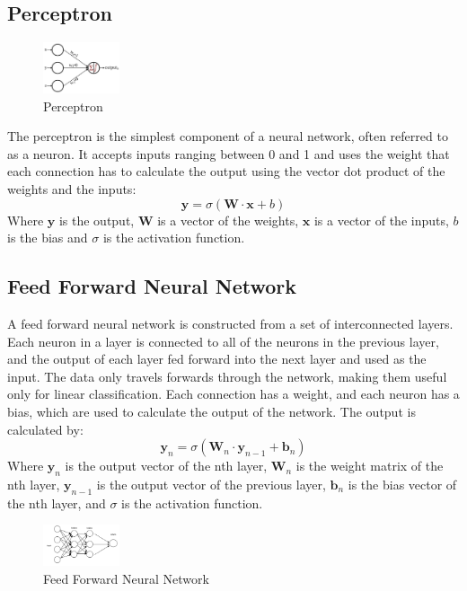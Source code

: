 \documentclass[a1,portrait]{a1poster}
\begin{document}
\begin{multicols}{2}
\subsection*{Perceptron}
\begin{figure}
    \centering
    \includegraphics[width=0.2\textwidth]{assets/perceptron.png}
    \caption{Perceptron}
    \label{fig:perceptron}
\end{figure}
The perceptron is the simplest component of a neural network, often referred to as a neuron. It accepts inputs ranging between 0 and 1 and uses the weight that each connection has to calculate the output using the vector dot product of the weights and the inputs:
\begin{equation}
    \textbf{y} = \sigma(\textbf{W}\cdot\textbf{x} + b)
    \label{eq:perceptron}
\end{equation}
Where $\textbf{y}$ is the output, $\textbf{W}$ is a vector of the weights, $\textbf{x}$ is a vector of the inputs, $b$ is the bias and $\sigma$ is the activation function.

\subsection*{Feed Forward Neural Network}
A feed forward neural network is constructed from a set of interconnected layers. Each neuron in a layer is connected to all of the neurons in the previous layer, and the output of each layer fed forward into the next layer and used as the input. The data only travels forwards through the network, making them useful only for linear classification. Each connection has a weight, and each neuron has a bias, which are used to calculate the output of the network. The output is calculated by: 
\begin{equation}
    \textbf{y}_n=\sigma{(\textbf{W}_n\cdot\textbf{y}_{n-1} + \textbf{b}_n)}
    \label{eq:feed-forward}
\end{equation}
Where $\textbf{y}_n$ is the output vector of the nth layer, $\textbf{W}_n$ is the weight matrix of the nth layer, $\textbf{y}_{n-1}$ is the output vector of the previous layer, $\textbf{b}_n$ is the bias vector of the nth layer, and $\sigma$ is the activation function.
\begin{figure}
    \centering
    \includegraphics[width=0.2\textwidth]{assets/feed forward.png}
    \caption{Feed Forward Neural Network}
    \label{fig:feed-forward}
\end{figure}

\end{multicols}
\end{document}
